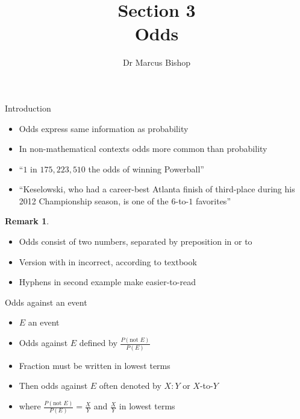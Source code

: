\documentclass[handout]{beamer}
\title[\S3]{Section 3\\Odds}
\author{Dr Marcus Bishop}
\theoremstyle{definition}
\newtheorem{remark}{Remark}
\begin{document}
\begin{frame}\titlepage\end{frame}
\LogoOff

\begin{frame}{Introduction}
\begin{itemize}
\item \alert{Odds} express same information as probability
\item In non-mathematical contexts
odds more common than probability
\end{itemize}
\begin{example}
\begin{itemize}
\item ``\alert{$1$ in $175,223,510$} the odds of winning Powerball''
\item ``Keselowski, who had a career-best Atlanta finish of third-place
during his 2012 Championship season, is one of the \alert{$6$-to-$1$} favorites''
\end{itemize}
\end{example}
\begin{remark}
\begin{itemize}
\item Odds consist of two numbers, separated by preposition \alert{in} or \alert{to}
\item Version with \alert{in} incorrect, according to textbook
\item Hyphens in second example make \alert{easier-to-read}
\end{itemize}
\end{remark}
\end{frame}

\begin{frame}{Odds against an event}
\begin{definition}
\begin{itemize}
\item $E$ an event
\item \alert{Odds against $E$} defined by
$\frac{P\left(\text{not $E$}\right)}{P\left(E\right)}$
\item Fraction must be written in \alert{lowest terms}
\item Then odds against $E$ often denoted by \alert{$X:Y$} or \alert{$X$-to-$Y$}
\item[]where $\frac{P\left(\text{not $E$}\right)}{P\left(E\right)}
=\frac{X}{Y}$ and $\frac{X}{Y}$ in lowest terms
\end{itemize}
\end{definition}
\end{frame}
\end{document}
